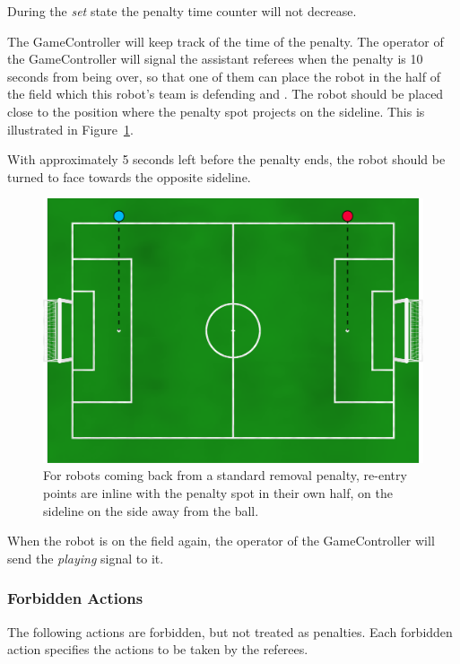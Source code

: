 During the \emph{set} state the penalty time counter will not decrease.

The GameController will keep track of the time of the penalty. The operator of the GameController will signal the assistant referees when the penalty is 10 seconds from being over, so that one of them can place the robot in the half of the field which this robot's team is defending and . The robot should be placed close to the position where the penalty spot projects on the sideline. This is illustrated in Figure~\ref{fig:penalty_re-entry_points}.

With approximately 5 seconds left before the penalty ends, the robot should be turned to face towards the opposite sideline.

\begin{figure}[t]
	\centerline{\includegraphics[width=\columnwidth]{figs/penalty_re-entry_points_2020.png}}
	\caption{For robots coming back from a standard removal penalty, re-entry points  are inline with the penalty spot in their own half, on the sideline on the side away from the ball.}
	\label{fig:penalty_re-entry_points}
\end{figure}

When the robot is on the field again, the operator of the GameController will send the \emph{playing} signal to it.

\subsubsection{Forbidden Actions}

The following actions are forbidden, but not treated as penalties.
Each forbidden action specifies the actions to be taken by the referees.

